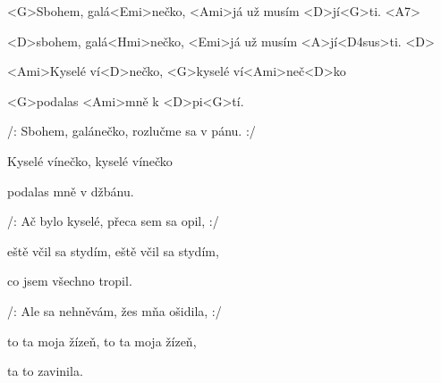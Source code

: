 

\zs
<G>Sbohem, galá<Emi>nečko,
<Ami>já už musím <D>jí<G>ti. <A7> 

<D>sbohem, galá<Hmi>nečko,
<Emi>já už musím <A>jí<D4sus>ti. <D> 

<Ami>Kyselé ví<D>nečko, <G>kyselé ví<Ami>neč<D>ko 

<G>podalas <Ami>mně k <D>pi<G>tí.
\ks

\zs
/: Sbohem, galánečko, rozlučme sa v pánu. :/

Kyselé vínečko, kyselé vínečko

podalas mně v džbánu.
\ks

\zs
/: Ač bylo kyselé, přeca sem sa opil, :/

eště včil sa stydím, eště včil sa stydím,

co jsem všechno tropil.
\ks

\zs
/: Ale sa nehněvám, žes mňa ošidila, :/

to ta moja žízeň, to ta moja žízeň,

ta to zavinila.
\ks
\kp
